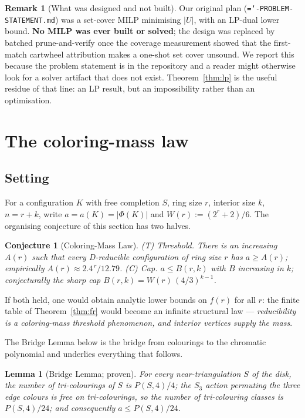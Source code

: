\documentclass[11pt]{article}
\newtheorem{lemma}[theorem]{Lemma}
\newtheorem{conjecture}[theorem]{Conjecture}
\theoremstyle{definition}
\newtheorem{remark}[theorem]{Remark}
\newcommand{\art}[1]{{\texttt{\hyphenchar\font=`\-\relax #1}}}
\begin{document}
\begin{remark}[What was designed and not built]
Our original plan (\art{01-PROBLEM-STATEMENT.md}) was a set-cover MILP minimising
$|U|$, with an LP-dual lower bound. \textbf{No MILP was ever built or solved}; the
design was replaced by batched prune-and-verify once the coverage measurement showed
that the first-match cartwheel attribution makes a one-shot set cover unsound. We
report this because the problem statement is in the repository and a reader might
otherwise look for a solver artifact that does not exist. Theorem~\ref{thm:lp} is
the useful residue of that line: an LP result, but an impossibility rather than an
optimisation.
\end{remark}

\section{The coloring-mass law}
\label{sec:mass}

\subsection{Setting}

For a configuration $K$ with free completion $S$, ring size $r$, interior size $k$,
$n=r+k$, write $a = a(K) = |\Phi(K)|$ and $W(r) := (2^r+2)/6$. The organising
conjecture of this section has two halves.

\begin{conjecture}[Coloring-Mass Law]
\label{conj:mass}
\emph{(T) Threshold.} There is an increasing $A(r)$ such that every D-reducible
configuration of ring size $r$ has $a \ge A(r)$; empirically
$A(r) \approx 2.4^{\,r}/12.79$.
\emph{(C) Cap.} $a \le B(r,k)$ with $B$ increasing in $k$; conjecturally the
\emph{sharp cap} $B(r,k) = W(r)\,(4/3)^{k-1}$.
\end{conjecture}

If both held, one would obtain analytic lower bounds on $f(r)$ for all $r$: the
finite table of Theorem~\ref{thm:fr} would become an infinite structural law
--- \emph{reducibility is a coloring-mass threshold phenomenon, and interior vertices
supply the mass}.

The Bridge Lemma below is the bridge from colourings to the chromatic polynomial and
underlies everything that follows.

\begin{lemma}[Bridge Lemma; proven]
\label{lem:bridge}
For every near-triangulation $S$ of the disk, the number of tri-colourings of $S$ is
$P(S,4)/4$; the $S_3$ action permuting the three edge colours is free on
tri-colourings, so the number of tri-colouring classes is $P(S,4)/24$; and
consequently $a \le P(S,4)/24$.
\end{lemma}
\end{document}

